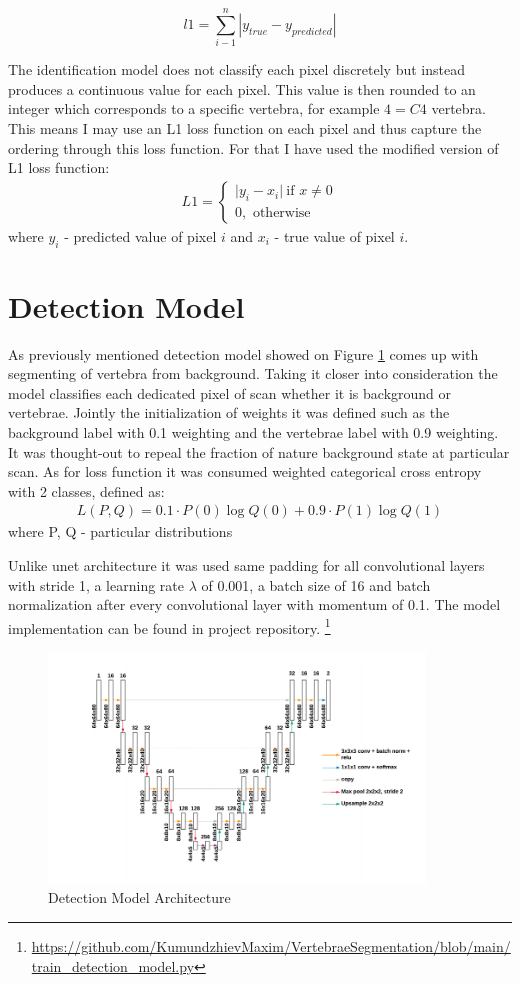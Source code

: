 \[ \text{$l$1} = \sum_{i-1}^n |y_{true} - y_{predicted}|\]

The identification model does not classify each pixel discretely but instead produces a continuous value for each pixel. This value is then rounded to an integer which corresponds to a specific vertebra, for example $4 = C4$ vertebra. This means I may use an L1 loss function on each pixel and thus capture the ordering through this loss function. For that I have used the modified version of L1 loss function: 
\begin{align*}
 L1 = \begin{cases} \lvert y_i - x_i \rvert\ \mbox{if } x\mbox{$\neq 0$} \\ 0, \mbox{ otherwise} \end{cases}
\end{align*}
where $y_i$ - predicted value of pixel $i$ and $x_i$ - true value of pixel $i$.


\section{Detection Model}
As previously mentioned detection model showed on Figure \ref{fig:detection_model} comes up with segmenting of vertebra from background. Taking it closer into consideration the model classifies each dedicated pixel of scan whether it is background or vertebrae. Jointly the initialization of weights it was  defined such as the background label with 0.1 weighting and the vertebrae label with 0.9 weighting. It was thought-out to repeal the fraction of nature background state at particular scan. As for loss function it was consumed \cite{Zhang2018} weighted categorical cross entropy with 2 classes, defined as:
\begin{align*}
 L(P, Q) = 0.1 \cdot P(0)\log Q(0) + 0.9 \cdot P(1)\log Q(1)
\end{align*}
where P, Q - particular distributions 

Unlike unet architecture it was used same padding for all convolutional layers with stride 1, a learning rate
$\lambda$ of 0.001, a batch size of 16 and batch normalization after every convolutional layer with momentum of 0.1. The model implementation can be found in project repository.
\footnote{ \url{https://github.com/KumundzhievMaxim/VertebraeSegmentation/blob/main/train_detection_model.py}}

\begin{figure}[h]
    \centering \includegraphics[width=10cm]{images/detection_model.png}
    \caption {Detection Model Architecture}
    \label{fig:detection_model}
\end{figure}
 

